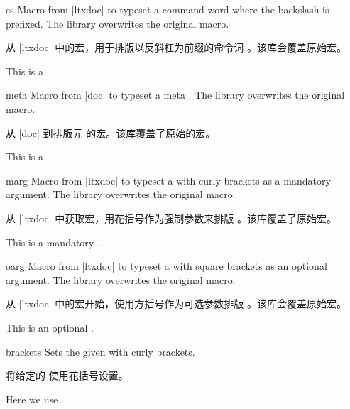 \begin{docCommand}{cs}{}
Macro from |ltxdoc| \cite{carlisle:ltxdoc} to typeset a command word 
where the backslash is prefixed. The library overwrites the original macro.

从 |ltxdoc| \cite{carlisle:ltxdoc} 中的宏，用于排版以反斜杠为前缀的命令词 。该库会覆盖原始宏。
\begin{dispExample}
This is a .
\end{dispExample}
\end{docCommand}

\begin{docCommand}{meta}{}
Macro from |doc| \cite{mittelbach:2011a} to typeset a meta .
The library overwrites the original macro.

从 |doc| \cite{mittelbach:2011a} 到排版元  的宏。该库覆盖了原始的宏。
\begin{dispExample}
This is a .
\end{dispExample}
\end{docCommand}


\begin{docCommand}{marg}{}
Macro from |ltxdoc| \cite{carlisle:ltxdoc} to typeset a  with
curly brackets as a mandatory argument. The library overwrites the original macro.

从 |ltxdoc| \cite{carlisle:ltxdoc} 中获取宏，用花括号作为强制参数来排版 。该库覆盖了原始宏。
\begin{dispExample}
This is a mandatory .
\end{dispExample}
\end{docCommand}

\begin{docCommand}{oarg}{}
Macro from |ltxdoc| \cite{carlisle:ltxdoc} to typeset a  with
square brackets as an optional argument. The library overwrites the original macro.

从 |ltxdoc| \cite{carlisle:ltxdoc} 中的宏开始，使用方括号作为可选参数排版 。该库会覆盖原始宏。
\begin{dispExample}
This is an optional .
\end{dispExample}
\end{docCommand}


\begin{docCommand}{brackets}{}
Sets the given  with curly brackets.

将给定的  使用花括号设置。
\begin{dispExample}
Here we use .
\end{dispExample}
\end{docCommand}